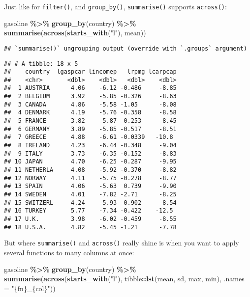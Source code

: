 \documentclass[
]{article}
\newenvironment{Shaded}{\begin{snugshade}}{\end{snugshade}}
\newcommand{\DataTypeTok}[1]{\textcolor[rgb]{0.13,0.29,0.53}{#1}}
\newcommand{\KeywordTok}[1]{\textcolor[rgb]{0.13,0.29,0.53}{\textbf{#1}}}
\newcommand{\NormalTok}[1]{#1}
\newcommand{\OperatorTok}[1]{\textcolor[rgb]{0.81,0.36,0.00}{\textbf{#1}}}
\newcommand{\StringTok}[1]{\textcolor[rgb]{0.31,0.60,0.02}{#1}}
\begin{document}
Just like for \texttt{filter()}, and \texttt{group\_by()}, \texttt{summarise()} supports \texttt{across()}:

\begin{Shaded}
\begin{Highlighting}[]
\NormalTok{gasoline }\OperatorTok{\%\textgreater{}\%}
\StringTok{  }\KeywordTok{group\_by}\NormalTok{(country) }\OperatorTok{\%\textgreater{}\%}
\StringTok{  }\KeywordTok{summarise}\NormalTok{(}\KeywordTok{across}\NormalTok{(}\KeywordTok{starts\_with}\NormalTok{(}\StringTok{"l"}\NormalTok{), mean))}
\end{Highlighting}
\end{Shaded}

\begin{verbatim}
## `summarise()` ungrouping output (override with `.groups` argument)
\end{verbatim}

\begin{verbatim}
## # A tibble: 18 x 5
##    country  lgaspcar lincomep   lrpmg lcarpcap
##    <chr>       <dbl>    <dbl>   <dbl>    <dbl>
##  1 AUSTRIA      4.06    -6.12 -0.486     -8.85
##  2 BELGIUM      3.92    -5.85 -0.326     -8.63
##  3 CANADA       4.86    -5.58 -1.05      -8.08
##  4 DENMARK      4.19    -5.76 -0.358     -8.58
##  5 FRANCE       3.82    -5.87 -0.253     -8.45
##  6 GERMANY      3.89    -5.85 -0.517     -8.51
##  7 GREECE       4.88    -6.61 -0.0339   -10.8 
##  8 IRELAND      4.23    -6.44 -0.348     -9.04
##  9 ITALY        3.73    -6.35 -0.152     -8.83
## 10 JAPAN        4.70    -6.25 -0.287     -9.95
## 11 NETHERLA     4.08    -5.92 -0.370     -8.82
## 12 NORWAY       4.11    -5.75 -0.278     -8.77
## 13 SPAIN        4.06    -5.63  0.739     -9.90
## 14 SWEDEN       4.01    -7.82 -2.71      -8.25
## 15 SWITZERL     4.24    -5.93 -0.902     -8.54
## 16 TURKEY       5.77    -7.34 -0.422    -12.5 
## 17 U.K.         3.98    -6.02 -0.459     -8.55
## 18 U.S.A.       4.82    -5.45 -1.21      -7.78
\end{verbatim}

But where \texttt{summarise()} and \texttt{across()} really shine is when you want to apply several functions
to many columns at once:

\begin{Shaded}
\begin{Highlighting}[]
\NormalTok{gasoline }\OperatorTok{\%\textgreater{}\%}
\StringTok{  }\KeywordTok{group\_by}\NormalTok{(country) }\OperatorTok{\%\textgreater{}\%}
\StringTok{  }\KeywordTok{summarise}\NormalTok{(}\KeywordTok{across}\NormalTok{(}\KeywordTok{starts\_with}\NormalTok{(}\StringTok{"l"}\NormalTok{), tibble}\OperatorTok{::}\KeywordTok{lst}\NormalTok{(mean, sd, max, min), }\DataTypeTok{.names =} \StringTok{"\{fn\}\_\{col\}"}\NormalTok{))}
\end{Highlighting}
\end{Shaded}
\end{document}

